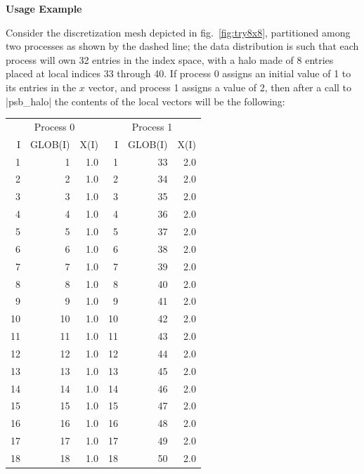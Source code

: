 {\par\noindent\large\bfseries Usage Example}
Consider the discretization mesh depicted in fig.~\ref{fig:try8x8},
partitioned among two processes as shown by the dashed line; the data
distribution is such that each process will own 32 entries in the
index space, with a halo made of 8 entries placed at local indices 33
through 40. If process 0 assigns an initial value of 1 to its entries
in the $x$ vector, and process 1 assigns a value of 2, then after a
call to \fortinline|psb_halo| the contents of the local vectors will be the
following: 
\begin{table}
\begin{center}
\small\begin{tabular}{rrr@{\hspace{6\tabcolsep}}rrr}
\multicolumn{3}{c}{Process  0}&
\multicolumn{3}{c}{Process  1}\\
  I  &   GLOB(I) & X(I)  &   I & GLOB(I) & X(I) \\
  1   &    1  &  1.0   &   1  &  33  &   2.0 \\ 
  2   &    2  &  1.0   &   2  &  34  &   2.0 \\
  3   &    3  &  1.0   &   3  &  35  &   2.0 \\
  4   &    4  &  1.0   &   4  &  36  &   2.0 \\
  5   &    5  &  1.0   &   5  &  37  &   2.0 \\
  6   &    6  &  1.0   &   6  &  38  &   2.0 \\
  7   &    7  &  1.0   &   7  &  39  &   2.0 \\
  8   &    8  &  1.0   &   8  &  40  &   2.0 \\
  9   &    9  &  1.0   &   9  &  41  &   2.0 \\
 10   &   10  &  1.0   &  10  &  42  &   2.0 \\
 11   &   11  &  1.0   &  11  &  43  &   2.0 \\
 12   &   12  &  1.0   &  12  &  44  &   2.0 \\
 13   &   13  &  1.0   &  13  &  45  &   2.0 \\
 14   &   14  &  1.0   &  14  &  46  &   2.0 \\
 15   &   15  &  1.0   &  15  &  47  &   2.0 \\
 16   &   16  &  1.0   &  16  &  48  &   2.0 \\
 17   &   17  &  1.0   &  17  &  49  &   2.0 \\
 18   &   18  &  1.0   &  18  &  50  &   2.0 \\

\end{tabular}
\end{center}
\end{table}
